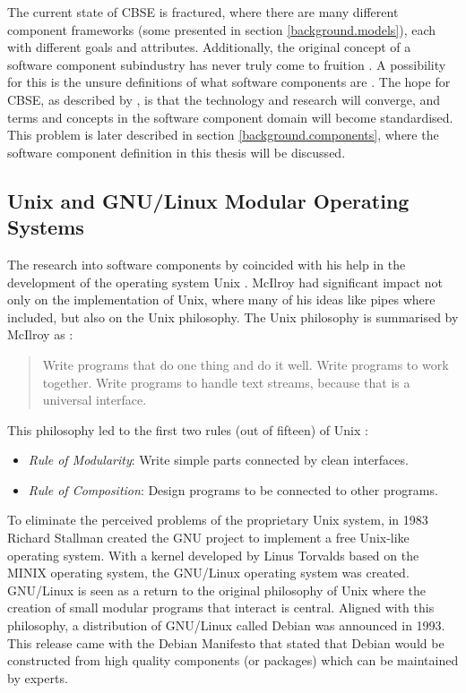 The current state of CBSE is fractured, where there are many different component frameworks (some presented in section \ref{background.models}),
each with different goals and attributes.
Additionally, the original concept of a software component subindustry has never truly come to fruition \citep{Szyperski2002}.
A possibility for this is the unsure definitions of what software components are \citep{Crnkovic2011}.
The hope for CBSE, as described by \cite{Crnkovic2011}, is that the technology and research will converge, and terms and concepts in the software component domain will become standardised.
This problem is later described in section \ref{background.components}, where the software component definition in this thesis will be discussed.

\subsection{Unix and GNU/Linux Modular Operating Systems}
The research into software components by \cite{McIlroy1969} coincided with his help in the development of the operating system Unix \citep{raymond2003art}. 
McIlroy had significant impact not only on the implementation of Unix, where many of his ideas like pipes where included,
but also on the Unix philosophy. 
The Unix philosophy is summarised by McIlroy as \citep{Salus1994}:
\begin{quote}
Write programs that do one thing and do it well. Write programs to work together. 
Write programs to handle text streams, because that is a universal interface.
\end{quote}

This philosophy led to the first two rules (out of fifteen) of Unix \citep{raymond2003art}:
\begin{itemize}
  \item \textit{Rule of Modularity}: Write simple parts connected by clean interfaces.
  \item \textit{Rule of Composition}: Design programs to be connected to other programs.
\end{itemize} 

To eliminate the perceived problems of the proprietary Unix system, in 1983 Richard Stallman created the GNU project \citep{stallman1985gnu} to implement a free Unix-like operating system.
With a kernel developed by Linus Torvalds based on the MINIX \citep{tanenbaum1989minix} operating system, the GNU/Linux \citep{torvalds2002just} operating system was created.
GNU/Linux is seen as a return to the original philosophy of Unix \citep{Gancarz2003} where the creation of small modular programs that interact is central.
Aligned with this philosophy, a distribution of GNU/Linux called Debian \citep{Barth2005} was announced in 1993.
This release came with the Debian Manifesto \citep{murdock1994brief} 
that stated that Debian would be constructed from high quality components (or packages) which can be maintained by experts.


